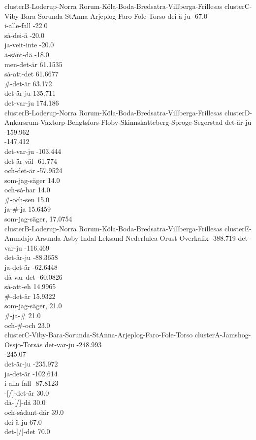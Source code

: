 clusterB-Loderup-Norra Rorum-K\"ola-Boda-Bredsatra-Villberga-Frillesas
clusterC-Viby-Bara-Sorunda-StAnna-Arjeplog-Faro-Fole-Torso
dei-\"a-ju -67.0 \\
i-alle-fall -22.0 \\
s\.a-dei-\"a -20.0 \\
ja-veit-inte -20.0 \\
\.a-s\.ant-d\"a -18.0 \\
men-det-\"ar 61.1535 \\
s\.a-att-det 61.6677 \\
\#-det-\"ar 63.172 \\
det-\"ar-ju 135.711 \\
det-var-ju 174.186 \\


clusterB-Loderup-Norra Rorum-K\"ola-Boda-Bredsatra-Villberga-Frillesas
clusterD-Ankarsrum-Vaxtorp-Bengtsfors-Floby-Skinnskatteberg-Sproge-Segerstad
det-\"ar-ju -159.962 \\
 -147.412 \\
det-var-ju -103.444 \\
det-\"ar-v\"al -61.774 \\
och-det-\"ar -57.9524 \\
som-jag-s\"ager 14.0 \\
och-s\.a-har 14.0 \\
\#-och-sen 15.0 \\
ja-\#-ja 15.6459 \\
som-jag-s\"ager, 17.0754 \\


clusterB-Loderup-Norra Rorum-K\"ola-Boda-Bredsatra-Villberga-Frillesas
clusterE-Anundsjo-Arsunda-Asby-Indal-Leksand-Nederlulea-Orust-Overkalix
 -388.719
det-var-ju -116.469 \\
det-\"ar-ju -88.3658 \\
ja-det-\"ar -62.6448 \\
d\.a-var-det -60.0826 \\
s\.a-att-eh 14.9965 \\
\#-det-\"ar 15.9322 \\
som-jag-s\"ager, 21.0 \\
\#-ja-\# 21.0 \\
och-\#-och 23.0 \\


clusterC-Viby-Bara-Sorunda-StAnna-Arjeplog-Faro-Fole-Torso
clusterA-Jamshog-Ossjo-Tors\.as
det-var-ju -248.993 \\
 -245.07 \\
det-\"ar-ju -235.972 \\
ja-det-\"ar -102.614 \\
i-alla-fall -87.8123 \\
 -[/]-det-\"ar 30.0 \\
d\.a-[/]-d\.a 30.0 \\
och-s\.adant-d\"ar 39.0 \\
dei-\"a-ju 67.0 \\
det-[/]-det 70.0 \\


